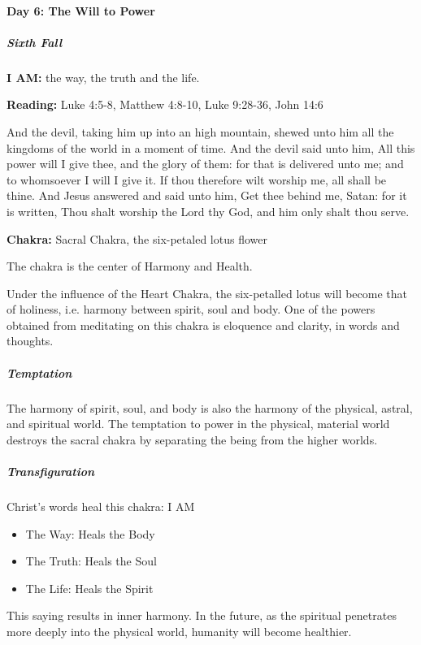 \paragraph{Day 6: The Will to Power}

\subparagraph{Sixth Fall}


\textbf{I AM:} the way, the truth and the life.

\textbf{Reading:} Luke 4:5-8, Matthew 4:8-10, Luke 9:28-36, John 14:6


\begin{quotex}
And the devil, taking him up into an high mountain, shewed unto him all the kingdoms of the world in a moment of time. And the devil said unto him, All this power will I give thee, and the glory of them: for that is delivered unto me; and to whomsoever I will I give it. If thou therefore wilt worship me, all shall be thine. And Jesus answered and said unto him, Get thee behind me, Satan: for it is written, Thou shalt worship the Lord thy God, and him only shalt thou serve. 

\end{quotex}

\textbf{Chakra:} Sacral Chakra, the six-petaled lotus flower

The chakra is the center of Harmony and Health.

Under the influence of the Heart Chakra, the six-petalled lotus will become that of holiness, i.e. harmony between spirit, soul and body. One of the powers obtained from meditating on this chakra is eloquence and clarity, in words and thoughts.


\subparagraph{Temptation}

The harmony of spirit, soul, and body is also the harmony of the physical, astral, and spiritual world. The temptation to power in the physical, material world destroys the sacral chakra by separating the being from the higher worlds.


\subparagraph{Transfiguration}

Christ's words heal this chakra: I AM


\begin{itemize}
\item The Way: Heals the Body 
\item The Truth: Heals the Soul 
\item The Life: Heals the Spirit 
\end{itemize}

This saying results in inner harmony. In the future, as the spiritual penetrates more deeply into the physical world, humanity will become healthier.


